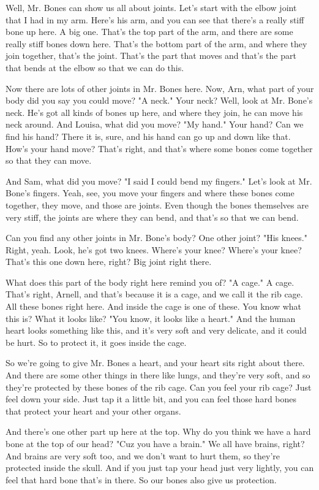 Well, Mr. Bones can show us all about joints. Let's start with the elbow joint that I had in my arm. Here's his arm, and you can see that there's a really stiff bone up here. A big one. That's the top part of the arm, and there are some really stiff bones down here. That's the bottom part of the arm, and where they join together, that's the joint. That's the part that moves and that's the part that bends at the elbow so that we can do this.

Now there are lots of other joints in Mr. Bones here. Now, Arn, what part of your body did you say you could move? "A neck." Your neck? Well, look at Mr. Bone's neck. He's got all kinds of bones up here, and where they join, he can move his neck around. And Louisa, what did you move? "My hand." Your hand? Can we find his hand? There it is, sure, and his hand can go up and down like that. How's your hand move? That's right, and that's where some bones come together so that they can move.

And Sam, what did you move? "I said I could bend my fingers." Let's look at Mr. Bone's fingers. Yeah, see, you move your fingers and where these bones come together, they move, and those are joints. Even though the bones themselves are very stiff, the joints are where they can bend, and that's so that we can bend.

Can you find any other joints in Mr. Bone's body? One other joint? "His knees." Right, yeah. Look, he's got two knees. Where's your knee? Where's your knee? That's this one down here, right? Big joint right there.

What does this part of the body right here remind you of? "A cage." A cage. That's right, Arnell, and that's because it is a cage, and we call it the rib cage. All these bones right here. And inside the cage is one of these. You know what this is? What it looks like? "You know, it looks like a heart." And the human heart looks something like this, and it's very soft and very delicate, and it could be hurt. So to protect it, it goes inside the cage.

So we're going to give Mr. Bones a heart, and your heart sits right about there. And there are some other things in there like lungs, and they're very soft, and so they're protected by these bones of the rib cage. Can you feel your rib cage? Just feel down your side. Just tap it a little bit, and you can feel those hard bones that protect your heart and your other organs.

And there's one other part up here at the top. Why do you think we have a hard bone at the top of our head? "Cuz you have a brain." We all have brains, right? And brains are very soft too, and we don't want to hurt them, so they're protected inside the skull. And if you just tap your head just very lightly, you can feel that hard bone that's in there. So our bones also give us protection.

